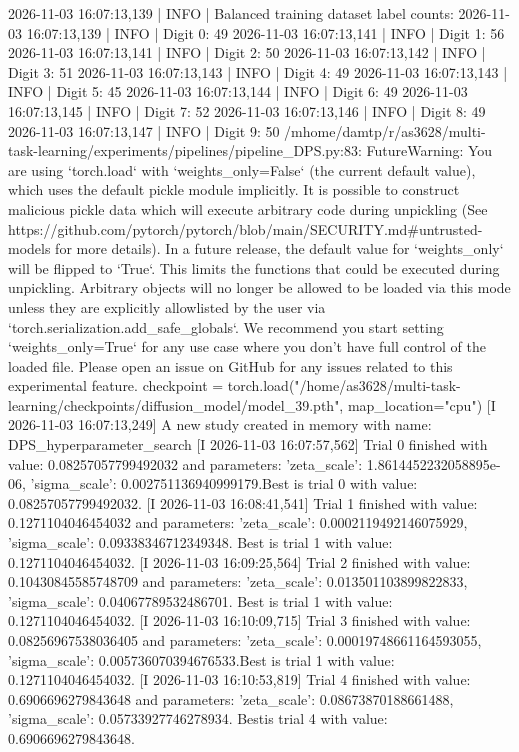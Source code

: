 2026-11-03 16:07:13,139 | INFO | Balanced training dataset label counts:
2026-11-03 16:07:13,139 | INFO | Digit 0: 49
2026-11-03 16:07:13,141 | INFO | Digit 1: 56
2026-11-03 16:07:13,141 | INFO | Digit 2: 50
2026-11-03 16:07:13,142 | INFO | Digit 3: 51
2026-11-03 16:07:13,143 | INFO | Digit 4: 49
2026-11-03 16:07:13,143 | INFO | Digit 5: 45
2026-11-03 16:07:13,144 | INFO | Digit 6: 49
2026-11-03 16:07:13,145 | INFO | Digit 7: 52
2026-11-03 16:07:13,146 | INFO | Digit 8: 49
2026-11-03 16:07:13,147 | INFO | Digit 9: 50
/mhome/damtp/r/as3628/multi-task-learning/experiments/pipelines/pipeline_DPS.py:83: FutureWarning: You are using `torch.load` with `weights_only=False` (the current default value), which uses the default pickle module implicitly. It is possible to construct malicious pickle data which will execute arbitrary code during unpickling (See https://github.com/pytorch/pytorch/blob/main/SECURITY.md#untrusted-models for more details). In a future release, the default value for `weights_only` will be flipped to `True`. This limits the functions that could be executed during unpickling. Arbitrary objects will no longer be allowed to be loaded via this mode unless they are explicitly allowlisted by the user via `torch.serialization.add_safe_globals`. We recommend you start setting `weights_only=True` for any use case where you don't have full control of the loaded file. Please open an issue on GitHub for any issues related to this experimental feature.
  checkpoint = torch.load("/home/as3628/multi-task-learning/checkpoints/diffusion_model/model_39.pth", map_location="cpu")
[I 2026-11-03 16:07:13,249] A new study created in memory with name: DPS_hyperparameter_search
[I 2026-11-03 16:07:57,562] Trial 0 finished with value: 0.08257057799492032 and parameters: {'zeta_scale': 1.8614452232058895e-06, 'sigma_scale': 0.002751136940999179}.Best is trial 0 with value: 0.08257057799492032.
[I 2026-11-03 16:08:41,541] Trial 1 finished with value: 0.1271104046454032 and parameters: {'zeta_scale': 0.0002119492146075929, 'sigma_scale': 0.09338346712349348}. Best is trial 1 with value: 0.1271104046454032.
[I 2026-11-03 16:09:25,564] Trial 2 finished with value: 0.10430845585748709 and parameters: {'zeta_scale': 0.013501103899822833, 'sigma_scale': 0.04067789532486701}. Best is trial 1 with value: 0.1271104046454032.
[I 2026-11-03 16:10:09,715] Trial 3 finished with value: 0.08256967538036405 and parameters: {'zeta_scale': 0.00019748661164593055, 'sigma_scale': 0.005736070394676533}.Best is trial 1 with value: 0.1271104046454032.
[I 2026-11-03 16:10:53,819] Trial 4 finished with value: 0.6906696279843648 and parameters: {'zeta_scale': 0.08673870188661488, 'sigma_scale': 0.05733927746278934}. Bestis trial 4 with value: 0.6906696279843648.
